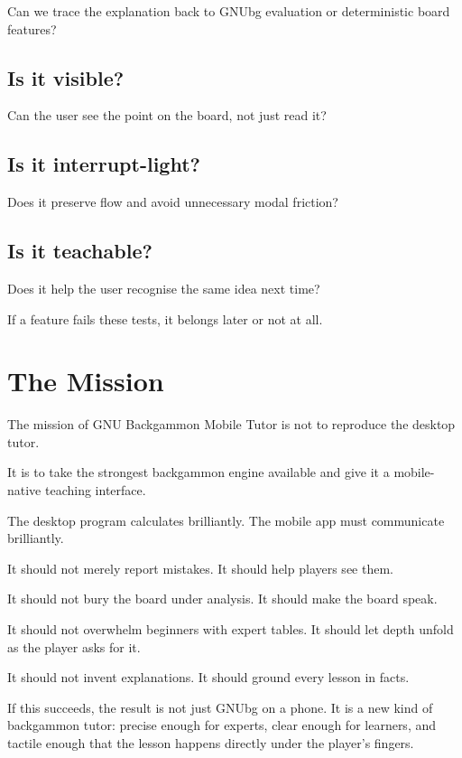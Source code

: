 \documentclass[11pt,a4paper]{article}
\begin{document}
Can we trace the explanation back to GNUbg evaluation or deterministic board features?

\subsection*{Is it visible?}

Can the user see the point on the board, not just read it?

\subsection*{Is it interrupt-light?}

Does it preserve flow and avoid unnecessary modal friction?

\subsection*{Is it teachable?}

Does it help the user recognise the same idea next time?

If a feature fails these tests, it belongs later or not at all.

\section{The Mission}

The mission of GNU Backgammon Mobile Tutor is not to reproduce the desktop tutor.

It is to take the strongest backgammon engine available and give it a mobile-native teaching interface.

The desktop program calculates brilliantly. The mobile app must communicate brilliantly.

It should not merely report mistakes. It should help players see them.

It should not bury the board under analysis. It should make the board speak.

It should not overwhelm beginners with expert tables. It should let depth unfold as the player asks for it.

It should not invent explanations. It should ground every lesson in facts.

If this succeeds, the result is not just GNUbg on a phone. It is a new kind of backgammon tutor: precise enough for experts, clear enough for learners, and tactile enough that the lesson happens directly under the player's fingers.
\end{document}
